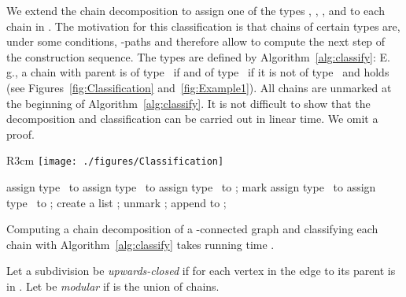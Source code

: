 We extend the chain decomposition to assign one of the types , , ,  and  to each chain in . The motivation for this classification is that chains of certain types are, under some conditions, \BG-paths and therefore allow to compute the next step of the construction sequence. The types are defined by Algorithm~\ref{alg:classify}: E.\,g., a chain  with parent  is of type~ if  and of type~ if it is not of type~ and  holds (see Figures~\ref{fig:Classification} and~\ref{fig:Example1}). All chains are unmarked at the beginning of Algorithm~\ref{alg:classify}. It is not difficult to show that the decomposition and classification can be carried out in linear time. We omit a proof.

\begin{wrapfigure}[12]{R}{3cm}
	\vspace{-0.99cm}
	\centering
	\texttt{[image: ./figures/Classification]}
	\caption{ and  are of type~,  is of type~,  of type~,  of type~ and  of type~.}
	\label{fig:Classification}
\end{wrapfigure}

\begin{algorithm}
\caption{classify}\label{alg:classify}\begin{algorithmic}[1]
	\State {}
	\label{typeone}
		\State assign type~ to 
	\ElsIf{}
			\State assign type~ to 
		\Else
			\State assign type~ to ; mark 
		\EndIf
	\Else {}
			\State assign type~ to 
		\Else {}
			\State assign type~ to ; create a list ; \label{assign}
				\State unmark ; append  to ; \label{unmarking}
			\EndWhile
		\EndIf
	\EndIf
\end{algorithmic}
\end{algorithm}


\begin{lemma}\label{ChainDecomposition}
Computing a chain decomposition of a -connected graph and classifying each chain with Algorithm~\ref{alg:classify} takes running time .
\end{lemma}


\begin{definition}\label{upwardsclosed}
Let a subdivision  be \emph{upwards-closed} if for each vertex in  the edge to its parent is in . Let  be \emph{modular} if  is the union of chains.
\end{definition}

